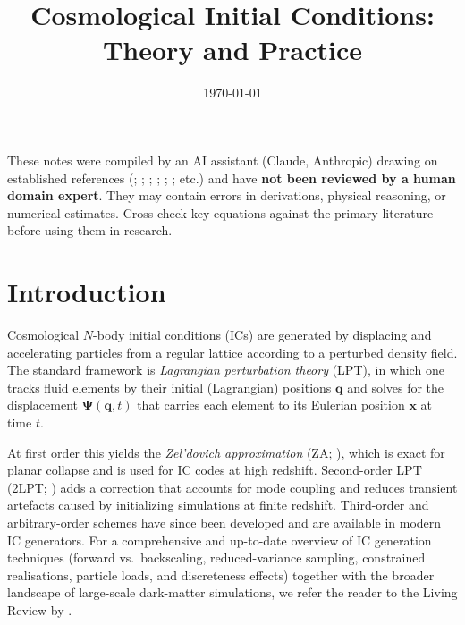 \documentclass[12pt]{article}
\title{Cosmological Initial Conditions: Theory and Practice}
\author{}
\date{\today}
\newcommand{\bq}{\mathbf{q}}
\newcommand{\bx}{\mathbf{x}}
\newcommand{\bPsi}{\boldsymbol{\Psi}}
\begin{document}
\maketitle
\tableofcontents
\newpage

\begin{tcolorbox}[colback=yellow!10!white, colframe=orange!75!black,
                  title={\bfseries Disclaimer}]
These notes were compiled by an AI assistant (Claude, Anthropic) drawing on
established references (\citealt{Jeong2010}; \citealt{Dodelson2021}; \citealt{Baumann2022}; \citealt{Tong2019}; \citealt{Choudhury2021}; \citealt{Dullemond2011}; etc.) and have \textbf{not been reviewed by a
human domain expert}.  They may contain errors in derivations, physical
reasoning, or numerical estimates.  Cross-check key equations against the
primary literature before using them in research.
\end{tcolorbox}
\vspace{0.5em}

\section{Introduction}

Cosmological $N$-body initial conditions (ICs) are generated by
displacing and accelerating particles from a regular lattice according
to a perturbed density field.  The standard framework is
\emph{Lagrangian perturbation theory} (LPT), in which one tracks
fluid elements by their initial (Lagrangian) positions $\bq$ and
solves for the displacement $\bPsi(\bq, t)$ that carries each element
to its Eulerian position $\bx$ at time $t$.

At first order this yields the \emph{Zel'dovich approximation} (ZA;
\citealt{Zeldovich1970}), which is exact for planar collapse and is
used for IC codes at high redshift.  Second-order LPT (2LPT;
\citealt{Buchert1993,Bouchet1995,Crocce2006}) adds a correction that
accounts for mode coupling and reduces transient artefacts caused by
initializing simulations at finite redshift.  Third-order and
arbitrary-order schemes have since been developed
\citep{Michaux2020,RampfHahn2021} and are available in modern
IC generators.  For a comprehensive and up-to-date overview of IC generation
techniques (forward vs.\ backscaling, reduced-variance sampling,
constrained realisations, particle loads, and discreteness effects)
together with the broader landscape of large-scale dark-matter
simulations, we refer the reader to the Living Review by
\citet{Angulo2022}.
\end{document}
